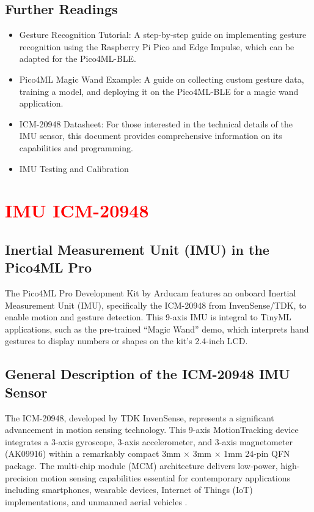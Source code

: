 \section{Further Readings}
\begin{itemize}
	\item Gesture Recognition Tutorial: A step-by-step guide on implementing gesture recognition using the Raspberry Pi Pico and Edge Impulse, which can be adapted for the Pico4ML-BLE.\cite{Nurgaliyev:2022}
	
	\item Pico4ML Magic Wand Example: A guide on collecting custom gesture data, training a model, and deploying it on the Pico4ML-BLE for a magic wand application. \cite{Arducam:2025b}
	
	\item ICM-20948 Datasheet: For those interested in the technical details of the IMU sensor, this document provides comprehensive information on its capabilities and programming.\cite{TDK:2024}
	
	\item IMU Testing and Calibration \cite{Vectornav:2021}
\end{itemize}






\chapter{\textcolor{red}{IMU ICM-20948}}





\section{Inertial Measurement Unit (IMU) in the Pico4ML Pro}

The Pico4ML Pro Development Kit by Arducam features an onboard Inertial Measurement Unit (IMU), specifically the ICM-20948 from InvenSense/TDK, to enable motion and gesture detection. This 9-axis IMU is integral to TinyML applications, such as the pre-trained ``Magic Wand'' demo, which interprets hand gestures to display numbers or shapes on the kit’s 2.4-inch LCD.

\section{General Description of the ICM-20948 IMU Sensor}
The ICM-20948, developed by TDK InvenSense, represents a significant advancement in motion sensing technology. This 9-axis MotionTracking device integrates a 3-axis gyroscope, 3-axis accelerometer, and 3-axis magnetometer (AK09916) within a remarkably compact 3mm × 3mm × 1mm 24-pin QFN package. The multi-chip module (MCM) architecture delivers low-power, high-precision motion sensing capabilities essential for contemporary applications including smartphones, wearable devices, Internet of Things (IoT) implementations, and unmanned aerial vehicles \cite{Wen:2014}.

